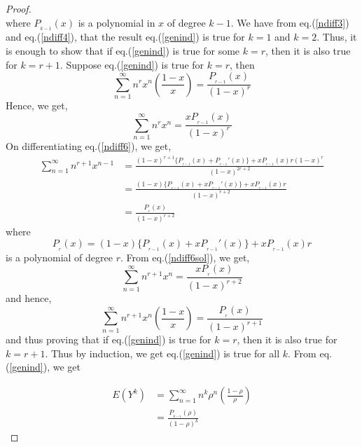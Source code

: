 \begin{multicols}{2}
\begin{proof}
\begin{equation}
\end{equation}
where $P_{_{k-1}}(x)$ is a polynomial in $x$ of degree $k-1$.
We have from eq.(\ref{ndiff3}) and eq.(\ref{ndiff4}), that the result eq.(\ref{genind}) is true for $k = 1$ and $k = 2$. Thus, it is enough to show that if eq.(\ref{genind}) is true for some $k = r$, then it is also true for $k = r+1$. Suppose eq.(\ref{genind}) is true for $k = r$, then
\begin{equation}\nonumber
\displaystyle{\sum_{n=1}^{\infty}}n^r x^n \left(\frac{1-x}{x}\right) = \displaystyle{\frac{P_{_{r-1}}(x)}{(1-x)^r}}
\end{equation}
Hence, we get,
\begin{equation}
\displaystyle{\sum_{n=1}^{\infty}}n^r x^n = \frac{xP_{_{r-1}}(x)}{(1-x)^r}\label{eq-13.10}
\end{equation}
On differentiating eq.(\ref{ndiff6}), we get,
{\fontsize{8}{9}\selectfont\begin{align}
\displaystyle{\sum_{n=1}^{\infty}}n^{r+1}x^{n-1} &= \frac{(1-x)^{r+1}\{P_{_{r-1}}(x)+P_{_{r-1}}'(x)\}+ xP_{_{r-1}}(x)r(1-x)^r}{(1-x)^{2r+2}}\nonumber\\
&= \frac{(1-x)\{P_{_{r-1}}(x) + xP_{_{r-1}}'(x)\}+ xP_{_{r-1}}(x)r}{(1-x)^{r+2}}\nonumber\\
&= \frac{P_{_r}(x)}{(1-x)^{r+2}}\label{eq-13.11}
\end{align}}
where 
\begin{equation}
P_{_r}(x) = (1-x)\{P_{_{r-1}}(x) + xP_{_{r-1}}'(x)\} + xP_{_{r-1}}(x)r\label{eq-13.12}
\end{equation}
is a polynomial of degree $r$. From eq.(\ref{ndiff6sol}), we get,
\begin{equation}\nonumber
\displaystyle{\sum_{n=1}^{\infty}}n^{r+1}x^n = \frac{xP_{_r}(x)}{(1-x)^{r+2}}
\end{equation}
and hence,
\begin{equation}\nonumber
\displaystyle{\sum_{n=1}^{\infty}}n^{r+1}x^n\left(\frac{1-x}{x}\right) = \frac{P_{_r}(x)}{(1-x)^{r+1}}
\end{equation}
and thus proving that if eq.(\ref{genind}) is true for $k = r$, then it is also true for $k = r+1$. Thus by induction, we get eq.(\ref{genind}) is true for all $k$.
From eq.(\ref{genind}), we get

\vspace{-1cm}

\begin{align}
E(Y^k) &= \displaystyle{\sum_{n=1}^{\infty}}n^k \rho^n \left(\frac{1-\rho}{\rho}\right)\nonumber\\
       &= \frac{P_{_{k-1}}(\rho)}{(1-\rho)^{k}}\nonumber
\end{align}


\end{proof}
\end{multicols}
